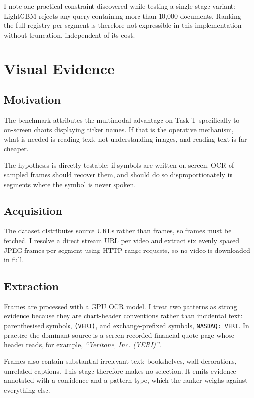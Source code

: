 \documentclass[conference]{IEEEtran}
\begin{document}
I note one practical constraint discovered while testing a single-stage variant:
LightGBM rejects any query containing more than 10{,}000 documents. Ranking the
full registry per segment is therefore not expressible in this implementation
without truncation, independent of its cost.

\section{Visual Evidence}
\label{sec:ocr}

\subsection{Motivation}

The benchmark attributes the multimodal advantage on Task T specifically to
on-screen charts displaying ticker names. If that is the operative mechanism,
what is needed is reading text, not understanding images, and reading text is
far cheaper.

The hypothesis is directly testable: if symbols are written on screen, OCR of
sampled frames should recover them, and should do so disproportionately in
segments where the symbol is never spoken.

\subsection{Acquisition}

The dataset distributes source URLs rather than frames, so frames must be
fetched. I resolve a direct stream URL per video and extract six evenly spaced
JPEG frames per segment using HTTP range requests, so no video is downloaded in
full.

\subsection{Extraction}

Frames are processed with a GPU OCR model. I treat two patterns as strong
evidence because they are chart-header conventions rather than incidental text:
parenthesised symbols, \texttt{(VERI)}, and exchange-prefixed symbols,
\texttt{NASDAQ: VERI}. In practice the dominant source is a screen-recorded
financial quote page whose header reads, for example, \emph{``Veritone, Inc.
(VERI)''}.

Frames also contain substantial irrelevant text: bookshelves, wall decorations,
unrelated captions. This stage therefore makes no selection. It emits evidence
annotated with a confidence and a pattern type, which the ranker weighs against
everything else.
\end{document}
